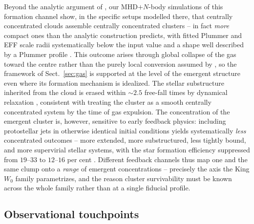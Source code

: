 \documentclass{aa}
\begin{document}
Beyond the analytic argument of \citet{Parmentier2013}, our
MHD$+$$N$-body simulations of this formation channel show, in the
specific setups modelled there, that centrally concentrated clouds
assemble centrally concentrated clusters -- in fact \emph{more} compact ones than the
analytic construction predicts, with fitted Plummer and EFF scale radii
systematically below the input value and a shape well described by a
Plummer profile \citep{Assilkhan2026}. This outcome arises through
global collapse of the gas toward the centre rather than the purely
local conversion assumed by \citet{Parmentier2013}, so the framework of
Sect.~\ref{sec:gas} is supported at the level of the emergent structure
even where its formation mechanism is idealized. The stellar
substructure inherited from the cloud is erased within $\sim$$2.5$
free-fall times by dynamical relaxation \citep{Akhmetali2026},
consistent with treating the cluster as a smooth centrally concentrated
system by the time of gas expulsion. The concentration of the emergent
cluster is, however, sensitive to early feedback physics: including
protostellar jets in otherwise identical initial conditions yields
systematically \emph{less} concentrated outcomes -- more extended, more
substructured, less tightly bound, and more supervirial stellar systems,
with the star formation efficiency suppressed from $19$--$33$ to
$12$--$16$ per cent \citep{AssilkhanJets2026}. Different feedback
channels thus map one and the same clump onto a \emph{range} of emergent
concentrations -- precisely the axis the King $W_0$ family parametrizes,
and the reason cluster survivability must be known across the whole
family rather than at a single fiducial profile.

\subsection{Observational touchpoints}
\label{sec:disc_obs}
\end{document}
